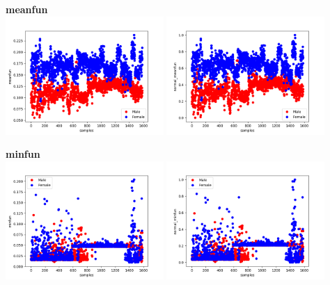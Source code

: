 \documentclass[12pt]{article}
\begin{document}
\begin{justify}
			\textbf{meanfun}\\
				\includegraphics[width=6cm]{../Graphs2/meanfun}
				\includegraphics[width=6cm]{../Graphs2/norm_meanfun}	
				
			\textbf{minfun}\\
				\includegraphics[width=6cm]{../Graphs2/minfun}
				\includegraphics[width=6cm]{../Graphs2/norm_minfun}	
				

\end{justify}
\end{document}
